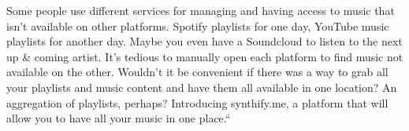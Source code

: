Some people use different services for managing and having access to music that isn't available on other platforms. Spotify playlists for one day, YouTube music playlists for another day. Maybe you even have a Soundcloud to listen to the next up \& coming artist. It’s tedious to manually open each platform to find music not available on the other. Wouldn't it be convenient if there was a way to grab all your playlists and music content and have them all available in one location? An aggregation of playlists, perhaps? Introducing synthify.me, a platform that will allow you to have all your music in one place.``

